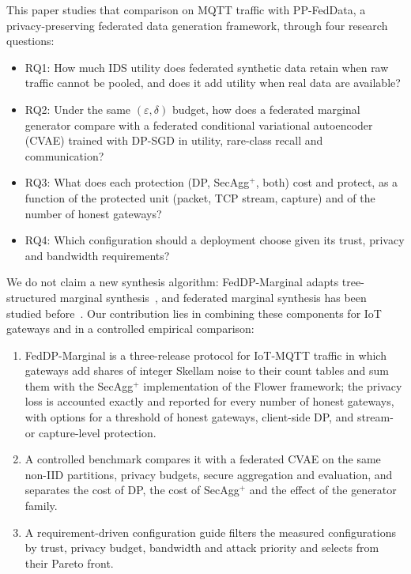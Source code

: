 \documentclass[conference]{IEEEtran}
\begin{document}
This paper studies that comparison on MQTT traffic with PP-FedData, a privacy-preserving federated data generation framework, through four research questions:
\begin{itemize}
    \item RQ1: How much IDS utility does federated synthetic data retain when raw traffic cannot be pooled, and does it add utility when real data are available?
    \item RQ2: Under the same $(\varepsilon, \delta)$ budget, how does a federated marginal generator compare with a federated conditional variational autoencoder (CVAE) trained with DP-SGD in utility, rare-class recall and communication?
    \item RQ3: What does each protection (DP, SecAgg$^+$, both) cost and protect, as a function of the protected unit (packet, TCP stream, capture) and of the number of honest gateways?
    \item RQ4: Which configuration should a deployment choose given its trust, privacy and bandwidth requirements?
\end{itemize}

We do not claim a new synthesis algorithm: FedDP-Marginal adapts tree-structured marginal synthesis~\cite{chow1968, mckenna2021mst}, and federated marginal synthesis has been studied before~\cite{maddock2024, pentyala2024}. Our contribution lies in combining these components for IoT gateways and in a controlled empirical comparison:
\begin{enumerate}
    \item FedDP-Marginal is a three-release protocol for IoT-MQTT traffic in which gateways add shares of integer Skellam noise to their count tables and sum them with the SecAgg$^+$ implementation of the Flower framework; the privacy loss is accounted exactly and reported for every number of honest gateways, with options for a threshold of honest gateways, client-side DP, and stream- or capture-level protection.
    \item A controlled benchmark compares it with a federated CVAE on the same non-IID partitions, privacy budgets, secure aggregation and evaluation, and separates the cost of DP, the cost of SecAgg$^+$ and the effect of the generator family.
    \item A requirement-driven configuration guide filters the measured configurations by trust, privacy budget, bandwidth and attack priority and selects from their Pareto front.
\end{enumerate}
\end{document}
